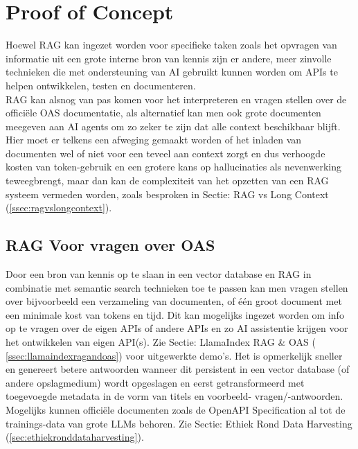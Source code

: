 
\chapter{Proof of Concept}%
\label{ch:proofofconcept}

Hoewel RAG kan ingezet worden voor specifieke taken zoals het opvragen van informatie uit een grote interne bron van kennis zijn er andere, meer zinvolle technieken die met ondersteuning van AI gebruikt kunnen worden om APIs te helpen ontwikkelen, testen en documenteren. \\

RAG kan alsnog van pas komen voor het interpreteren en vragen stellen over de officiële OAS documentatie, als alternatief kan men ook grote documenten meegeven aan AI agents om zo zeker te zijn dat alle context beschikbaar blijft. Hier moet er telkens een afweging gemaakt worden of het inladen van documenten wel of niet voor een teveel aan context zorgt en dus verhoogde kosten van token-gebruik en een grotere kans op hallucinaties als nevenwerking teweegbrengt, maar dan kan de complexiteit van het opzetten van een RAG systeem vermeden worden, zoals besproken in Sectie: RAG vs Long Context (\ref{ssec:ragvslongcontext}). \\

\section{RAG Voor vragen over OAS}
\label{sec:ragvoorvraagenoveroas}

Door een bron van kennis op te slaan in een vector database en RAG in combinatie met semantic search technieken toe te passen kan men vragen stellen over bijvoorbeeld een verzameling van documenten, of één groot document met een minimale kost van tokens en tijd. Dit kan mogelijks ingezet worden om info op te vragen over de eigen APIs of andere APIs en zo AI assistentie krijgen voor het ontwikkelen van eigen API(s). Zie Sectie: LlamaIndex RAG \& OAS ( \ref{ssec:llamaindexragandoas}) voor uitgewerkte demo's. Het is opmerkelijk sneller en genereert betere antwoorden wanneer dit persistent in een vector database (of andere opslagmedium) wordt opgeslagen en eerst getransformeerd met toegevoegde metadata in de vorm van titels en voorbeeld- vragen/-antwoorden. Mogelijks kunnen officiële documenten zoals de OpenAPI Specification al tot de trainings-data van grote LLMs behoren. Zie Sectie: Ethiek Rond Data Harvesting (\ref{sec:ethiekronddataharvesting}).


